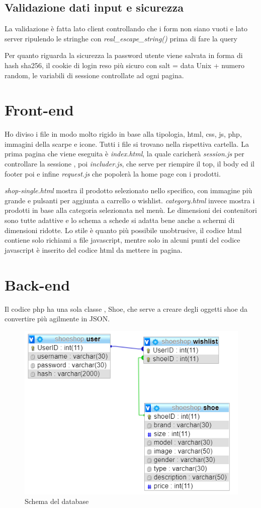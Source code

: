 \documentclass[a4paper,12pt]{article}
\begin{document}
\subsection{Validazione dati input e sicurezza}
La validazione è fatta lato client controllando che i form non siano vuoti e lato server
ripulendo le stringhe con \textit{real\_escape\_string()} prima di fare la query

Per quanto riguarda la sicurezza la password utente viene salvata in forma di hash sha256, il cookie di
login reso più sicuro con salt = data Unix + numero random, le variabili di sessione controllate ad ogni pagina.
\section{Front-end}
Ho diviso i file in modo molto rigido in base alla tipologia, html, css, js, php, immagini della scarpe e icone.
Tutti i file si trovano nella rispettiva cartella. La prima pagina che viene eseguita è
\textit{index.html}, la quale caricherà \textit{session.js} per controllare la sessione
, poi \textit{includer.js}, che serve per riempire il top, il body  ed il footer poi
e infine \textit{request.js} che popolerà la home page con i prodotti.

\textit{shop-single.html} mostra il prodotto selezionato nello specifico, con immagine più grande
e pulsanti per aggiunta a carrello o wishlist. \textit{category.html} invece mostra
i prodotti in base alla categoria selezionata nel menù.
Le dimensioni dei contenitori sono tutte adattive e lo schema a schede si adatta bene
anche a schermi di dimensioni ridotte.
Lo stile è quanto più possibile unobtrusive, il codice html contiene solo richiami a file javascript,
mentre solo in alcuni punti del codice javascript è inserito del codice html da mettere in pagina.

\section{Back-end}
Il codice php ha una sola classe , Shoe, che serve a creare degli oggetti shoe da convertire più agilmente
in JSON.
\begin{figure}[h!]
	\centering
	\includegraphics[width=1\textwidth]{db.png}
	\caption{Schema del database}
\end{figure}
\end{document}
